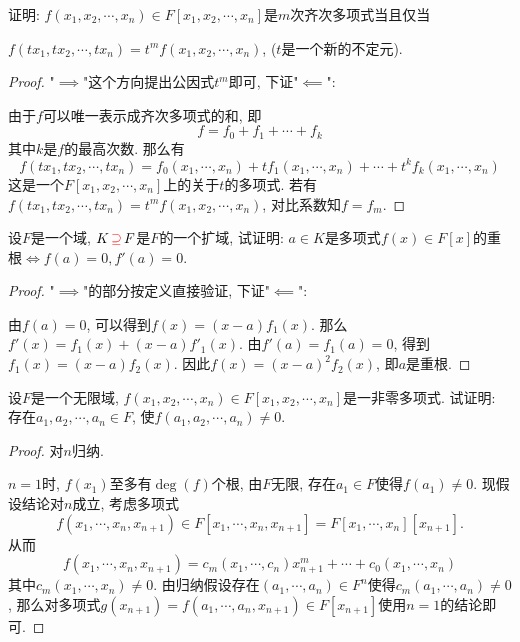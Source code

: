 \documentclass{../solutions-cn}
\begin{document}
\begin{exercise}[习题2.4.2]
    证明: $f(x_1, x_2, \cdots, x_n) \in F[x_1, x_2, \cdots, x_n]$是$m$次齐次多项式当且仅当
    
    $f(tx_1, tx_2, \cdots, tx_n) = t^mf(x_1, x_2, \cdots, x_n)$, ($t$是一个新的不定元).
\end{exercise}

\begin{proof}
    "$\implies$"这个方向提出公因式$t^m$即可, 下证"$\impliedby$":

    由于$f$可以唯一表示成齐次多项式的和, 即
    \[
        f = f_0 + f_1 + \cdots + f_k
    \]
    其中$k$是$f$的最高次数. 那么有
    \[
        f(tx_1, tx_2, \cdots, tx_n) = f_0(x_1, \cdots, x_n) + tf_1(x_1, \cdots, x_n) + \cdots + t^kf_k(x_1, \cdots, x_n)
    \]
    这是一个$F[x_1, x_2, \cdots, x_n]$上的关于$t$的多项式. 若有$f(tx_1, tx_2, \cdots, tx_n) = t^mf(x_1, x_2, \cdots, x_n)$, 对比系数知$f = f_m$.
\end{proof}

\begin{exercise}[习题2.4.3]
    设$F$是一个域, $K \,\textcolor{red}{\supseteq}\, F$是$F$的一个扩域, 试证明: $a \in K$是多项式$f(x) \in F[x]$的重根$\Leftrightarrow f(a) = 0, f'(a) = 0$.
\end{exercise}

\begin{proof}
    "$\implies$"的部分按定义直接验证, 下证"$\impliedby$":

    由$f(a) = 0$, 可以得到$f(x) = (x - a)f_1(x)$. 那么$f'(x) = f_1(x) + (x - a)f'_1(x)$. 由$f'(a) = f_1(a) = 0$, 得到$f_1(x) = (x - a)f_2(x)$. 因此$f(x) = (x - a)^2f_2(x)$, 即$a$是重根.
\end{proof}

\begin{exercise}[习题2.4.4]
    设$F$是一个无限域, $f(x_1, x_2, \cdots ,x_n) \in F[x_1, x_2, \cdots,x_n]$是一非零多项式. 试证明: 存在$a_1, a_2, \cdots, a_n \in F$, 使$f(a_1, a_2, \cdots, a_n) \neq 0$.
\end{exercise}

\begin{proof}
    对$n$归纳.
    
    $n = 1$时, $f(x_1)$至多有$\deg(f)$个根, 由$F$无限, 存在$a_1 \in F$使得$f(a_1) \neq 0$. 现假设结论对$n$成立, 考虑多项式
    \[
        f(x_1, \cdots, x_n, x_{n + 1}) \in F[x_1, \cdots, x_n, x_{n + 1}] = F[x_1, \cdots, x_n][x_{n + 1}].
    \]
    从而
    \[
        f(x_1, \cdots, x_n, x_{n + 1}) = c_m(x_1, \cdots, c_n)x_{n + 1}^m + \cdots + c_0(x_1, \cdots, x_n)
    \]
    其中$c_m(x_1, \cdots, x_n) \neq 0$. 由归纳假设存在$(a_1, \cdots, a_n) \in F^n$使得$c_m(a_1, \cdots, a_n) \neq 0$, 那么对多项式$g(x_{n + 1}) = f(a_1, \cdots, a_n, x_{n + 1}) \in F[x_{n + 1}]$使用$n = 1$的结论即可.
\end{proof}
\end{document}
